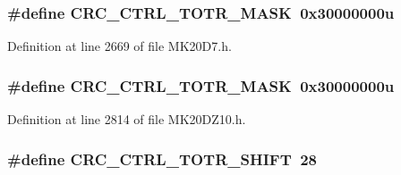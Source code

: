 \subsubsection[{\texorpdfstring{C\+R\+C\+\_\+\+C\+T\+R\+L\+\_\+\+T\+O\+T\+R\+\_\+\+M\+A\+SK}{CRC_CTRL_TOTR_MASK}}]{\setlength{\rightskip}{0pt plus 5cm}\#define C\+R\+C\+\_\+\+C\+T\+R\+L\+\_\+\+T\+O\+T\+R\+\_\+\+M\+A\+SK~0x30000000u}\hypertarget{group___c_r_c___register___masks_ga1af35cbb29862b18aee64fd4f32bca07}{}\label{group___c_r_c___register___masks_ga1af35cbb29862b18aee64fd4f32bca07}


Definition at line 2669 of file M\+K20\+D7.\+h.

\subsubsection[{\texorpdfstring{C\+R\+C\+\_\+\+C\+T\+R\+L\+\_\+\+T\+O\+T\+R\+\_\+\+M\+A\+SK}{CRC_CTRL_TOTR_MASK}}]{\setlength{\rightskip}{0pt plus 5cm}\#define C\+R\+C\+\_\+\+C\+T\+R\+L\+\_\+\+T\+O\+T\+R\+\_\+\+M\+A\+SK~0x30000000u}\hypertarget{group___c_r_c___register___masks_ga1af35cbb29862b18aee64fd4f32bca07}{}\label{group___c_r_c___register___masks_ga1af35cbb29862b18aee64fd4f32bca07}


Definition at line 2814 of file M\+K20\+D\+Z10.\+h.

\subsubsection[{\texorpdfstring{C\+R\+C\+\_\+\+C\+T\+R\+L\+\_\+\+T\+O\+T\+R\+\_\+\+S\+H\+I\+FT}{CRC_CTRL_TOTR_SHIFT}}]{\setlength{\rightskip}{0pt plus 5cm}\#define C\+R\+C\+\_\+\+C\+T\+R\+L\+\_\+\+T\+O\+T\+R\+\_\+\+S\+H\+I\+FT~28}\hypertarget{group___c_r_c___register___masks_gab309d177a917d972212c78481cf25d4d}{}\label{group___c_r_c___register___masks_gab309d177a917d972212c78481cf25d4d}


